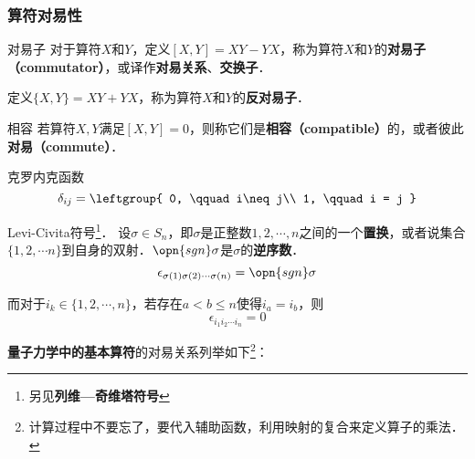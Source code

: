 \subsubsection{算符对易性}




\begin{definition}{对易子}\label{ComOpQ_def13}
对于算符$X$和$Y$，定义$[X, Y]=XY-YX$，称为算符$X$和$Y$的\textbf{对易子（commutator）}，或译作\textbf{对易关系}、\textbf{交换子}．

定义$\{X, Y\}=XY+YX$，称为算符$X$和$Y$的\textbf{反对易子}．
\end{definition}


\begin{definition}{相容}\label{ComOpQ_def17}
若算符$X, Y$满足$[X, Y]=0$，则称它们是\textbf{相容（compatible）}的，或者彼此\textbf{对易（commute）}．
\end{definition}



\begin{definition}{克罗内克函数}
\begin{equation}
\delta_{ij} = \leftgroup{
    0, \qquad i\neq j\\
    1, \qquad i = j
}
\end{equation}
\end{definition}




\begin{definition}{Levi-Civita符号\footnote{另见\textbf{列维—奇维塔符号}}．}
设$\sigma\in S_n$，即$\sigma$是正整数$1, 2, \cdots, n$之间的一个\textbf{置换}，或者说集合$\{1, 2, \cdots n\}$到自身的双射．$\opn{sgn}\sigma$是$\sigma$的\textbf{逆序数}．
\begin{equation}
\epsilon_{\sigma(1) \sigma(2) \cdots \sigma(n)}=\opn{sgn}\sigma
\end{equation}

而对于$i_k\in\{1, 2, \cdots, n\}$，若存在$a<b\leq n$使得$i_a=i_b$，则
\begin{equation}
\epsilon_{i_1 i_2 \cdots i_n} = 0
\end{equation}

\end{definition}


\textbf{量子力学中的基本算符}的对易关系列举如下\footnote{计算过程中不要忘了，要代入辅助函数，利用映射的复合来定义算子的乘法．}：

